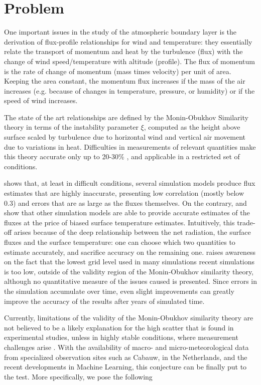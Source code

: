 \documentclass[a4paper]{book}
\begin{document}
\section{Problem}
\label{sec:problem}
One important issues in the study of the atmospheric boundary layer is the derivation of flux-profile relationships for wind and temperature: they essentially relate the transport of momentum and heat by the turbulence (flux) with the change of wind speed/temperature with altitude (profile). The flux of momentum is the rate of change of momentum (mass times velocity) per unit of area. Keeping the area constant, the momentum flux increases if the mass of the air increases (e.g. because of changes in temperature, pressure, or humidity) or if the speed of wind increases.

The state of the art relationships are defined by the Monin-Obukhov Similarity theory in terms of the instability parameter $\xi$, computed as the height above surface scaled by turbulence due to horizontal wind and vertical air movement due to variations in heat. Difficulties in measurements of relevant quantities make this theory accurate only up to 20-30\% \citep{basicatm}, and applicable in a restricted set of conditions.

\cite{sheba} shows that, at least in difficult conditions, several simulation models produce flux estimates that are highly inaccurate, presenting low correlation (mostly below 0.3) and errors that are as large as the fluxes themselves. On the contrary, \citep{boundary_layer_impact_in_sim} and \citep{most_sim} show that other simulation models are able to provide accurate estimates of the fluxes at the price of biased surface temperature estimates. Intuitively, this trade-off arises because of the deep relationship between the net radiation, the surface fluxes and the surface temperature: one can choose which two quantities to estimate accurately, and sacrifice accuracy on the remaining one. \cite{most_les} raises awareness on the fact that the lowest grid level used in many simulations recent simulations is too low, outside of the validity region of the Monin-Obukhov similarity theory, although no quantitative measure of the issues caused is presented. Since errors in the simulation accumulate over time, even slight improvements can greatly improve the accuracy of the results after years of simulated time.

Currently, limitations of the validity of the Monin-Obukhov similarity theory are not believed to be a likely explanation for the high scatter that is found in experimental studies, unless in highly stable conditions, where measurement challenges arise \citep{basicatm}. With the availability of macro- and micro-meteorological data from specialized observation sites such as Cabauw, in the Netherlands, and the recent developments in Machine Learning, this conjecture can be finally put to the test. More specifically, we pose the following \\
\end{document}
